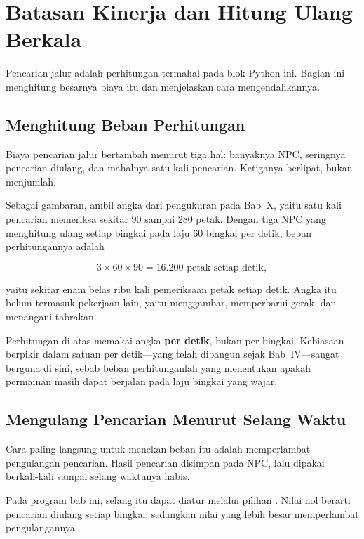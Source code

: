 \section{Batasan Kinerja dan Hitung Ulang Berkala}
\label{sec:batas-kinerja}

Pencarian jalur adalah perhitungan termahal pada blok Python ini. Bagian ini
menghitung besarnya biaya itu dan menjelaskan cara mengendalikannya.

\subsection{Menghitung Beban Perhitungan}

Biaya pencarian jalur bertambah menurut tiga hal: banyaknya NPC, seringnya
pencarian diulang, dan mahalnya satu kali pencarian. Ketiganya berlipat, bukan
menjumlah.

Sebagai gambaran, ambil angka dari pengukuran pada Bab~X, yaitu satu kali
pencarian memeriksa sekitar 90 sampai 280 petak. Dengan tiga NPC yang
menghitung ulang setiap bingkai pada laju 60 bingkai per detik, beban
perhitungannya adalah

\[
3 \times 60 \times 90 = 16.200 \text{ petak setiap detik},
\]

yaitu sekitar enam belas ribu kali pemeriksaan petak setiap detik. Angka itu
belum termasuk pekerjaan lain, yaitu menggambar, memperbarui gerak, dan
menangani tabrakan.

\begin{catatabox}
Perhitungan di atas memakai angka \textbf{per detik}, bukan
per bingkai. Kebiasaan berpikir dalam satuan per detik---yang telah dibangun
sejak Bab~IV---sangat berguna di sini, sebab beban perhitunganlah yang
menentukan apakah permainan masih dapat berjalan pada laju bingkai yang wajar.
\end{catatabox}

\subsection{Mengulang Pencarian Menurut Selang Waktu}

Cara paling langsung untuk menekan beban itu adalah memperlambat pengulangan
pencarian. Hasil pencarian disimpan pada NPC, lalu dipakai berkali-kali sampai
selang waktunya habis.

Pada program bab ini, selang itu dapat diatur melalui pilihan .
Nilai nol berarti pencarian diulang setiap bingkai, sedangkan nilai yang lebih
besar memperlambat pengulangannya.

